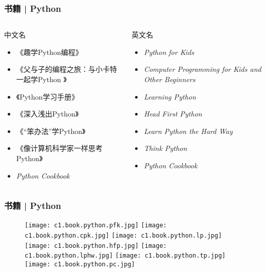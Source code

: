 \begin{frame}
  \frametitle{书籍 | Python}
  \begin{columns}
  \begin{block}{中文名}
    \begin{itemize}
      \item 《趣学Python编程》
      \item 《父与子的编程之旅：与小卡特一起学Python 》
      \item 《Python学习手册》
      \item 《深入浅出Python》
      \item 《“笨办法”学Python》
      \item 《像计算机科学家一样思考Python》
      \item \textit{Python Cookbook}
    \end{itemize}
  \end{block}
  \begin{block}{英文名}
    \begin{itemize}
      \item \textit{Python for Kids}
      \item \textit{Computer Programming for Kids and Other Beginners}
      \item \textit{Learning Python}
      \item \textit{Head First Python}
      \item \textit{Learn Python the Hard Way}
      \item \textit{Think Python}
        \vspace{1em}
      \item \textit{Python Cookbook}
    \end{itemize}
  \end{block}
\end{columns}
\end{frame}

\begin{frame}
  \frametitle{书籍 | Python}
  \begin{figure}
    \centering
    \texttt{[image: c1.book.python.pfk.jpg]}\quad
    \texttt{[image: c1.book.python.cpk.jpg]}\quad
    \texttt{[image: c1.book.python.lp.jpg]}\\
    \texttt{[image: c1.book.python.hfp.jpg]}\quad
    \texttt{[image: c1.book.python.lphw.jpg]}\quad
    \texttt{[image: c1.book.python.tp.jpg]}\quad
    \texttt{[image: c1.book.python.pc.jpg]}
  \end{figure}
\end{frame}

